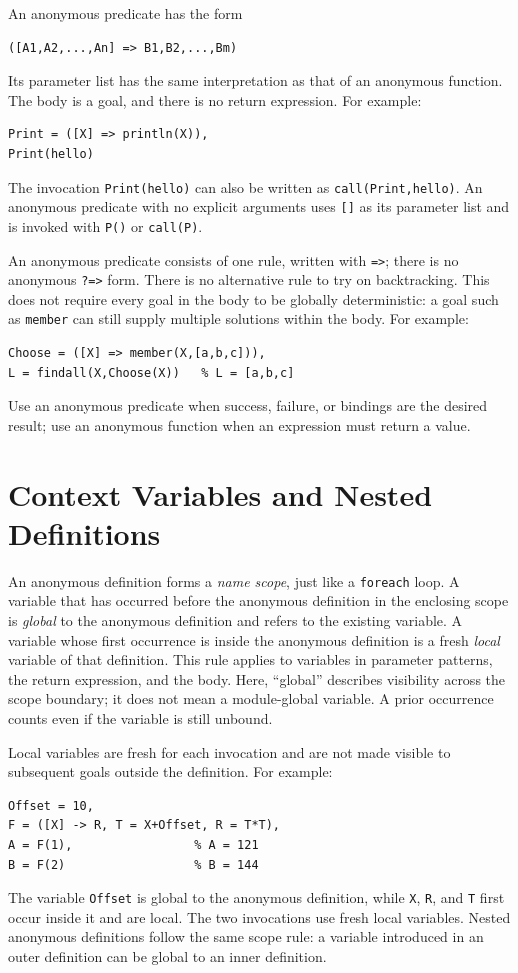 An anonymous predicate has the form
\begin{verbatim}
([A1,A2,...,An] => B1,B2,...,Bm)
\end{verbatim}
Its parameter list has the same interpretation as that of an anonymous
function. The body is a goal, and there is no return expression. For example:
\begin{verbatim}
Print = ([X] => println(X)),
Print(hello)
\end{verbatim}
The invocation \texttt{Print(hello)} can also be written as
\texttt{call(Print,hello)}. An anonymous predicate with no explicit arguments
uses \texttt{[]} as its parameter list and is invoked with \texttt{P()} or
\texttt{call(P)}.

An anonymous predicate consists of one rule, written with \texttt{=>}; there
is no anonymous \texttt{?=>} form. There is no alternative rule to try on
backtracking. This does not require every goal in the body to be globally
deterministic: a goal such as \texttt{member} can still supply multiple
solutions within the body. For example:
\begin{verbatim}
Choose = ([X] => member(X,[a,b,c])),
L = findall(X,Choose(X))   % L = [a,b,c]
\end{verbatim}
Use an anonymous predicate when success, failure, or bindings are the desired
result; use an anonymous function when an expression must return a value.

\section{Context Variables and Nested Definitions}

An anonymous definition forms a \emph{name scope}, just like a
\texttt{foreach} loop. A variable that has occurred before the anonymous
definition in the enclosing scope is \emph{global} to the anonymous
definition and refers to the existing variable. A variable whose first
occurrence is inside the anonymous definition is a fresh \emph{local}
variable of that definition. This rule applies to variables in parameter
patterns, the return expression, and the body. Here, ``global'' describes
visibility across the scope boundary; it does not mean a module-global
variable. A prior occurrence counts even if the variable is still unbound.

Local variables are fresh for each invocation and are not made visible to
subsequent goals outside the definition. For example:
\begin{verbatim}
Offset = 10,
F = ([X] -> R, T = X+Offset, R = T*T),
A = F(1),                 % A = 121
B = F(2)                  % B = 144
\end{verbatim}
The variable \texttt{Offset} is global to the anonymous definition, while
\texttt{X}, \texttt{R}, and \texttt{T} first occur inside it and are local.
The two invocations use fresh local variables. Nested anonymous definitions
follow the same scope rule: a variable introduced in an outer definition can
be global to an inner definition.

